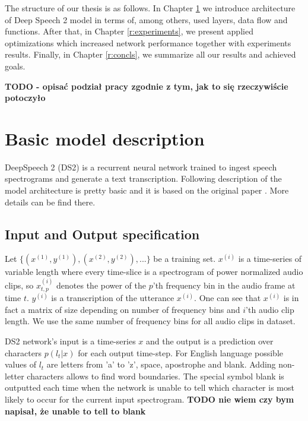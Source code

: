 \documentclass[licencjacka,en]{pracamgr}
\begin{document}
The structure of our thesis is as follows. In Chapter \ref{r:desc} we introduce architecture of Deep Speech 2 model in terms of, among others, used layers, data flow and functions. After that, in Chapter \ref{r:experiments}, we present applied optimizations which increased network performance together with experiments results. Finally, in Chapter \ref{r:concls}, we summarize all our results and achieved goals.

\textbf{TODO - opisać podział pracy zgodnie z tym, jak to się rzeczywiście potoczyło}

\chapter{Basic model description}\label{r:desc}

DeepSpeech 2 (DS2) is a recurrent neural network trained to ingest speech spectrograms and generate a text transcription.
Following description of the model architecture is pretty basic and it is based on the original paper \cite{DS2}. More details can be find there.

\section{Input and Output specification} \label{sec:input}
Let $\{(x^{(1)}, y^{(1)}), (x^{(2)}, y^{(2)}), ...\}$ be a training set. $x^{(i)}$ is a time-series of variable length where every time-slice is a spectrogram of power
normalized audio clips, so $x^{(i)}_{t,p}$ denotes the power of the $p$’th frequency bin in the audio frame at time $t$. $y^{(i)}$ is a transcription of the utterance $x^{(i)}$. One can see that $x^{(i)}$ is in fact a matrix of size depending on number of frequency bins and $i$'th audio clip length. We use the same number of frequency bins for all audio clips in dataset.

DS2 network's input is a time-series $x$ and the output is a prediction over characters $p(l_t|x)$ for each output time-step. For English language possible values of $l_t$ are letters from 'a' to 'z', space, apostrophe and blank. Adding non-letter characters allows to find word boundaries. The special symbol blank is outputted each time when the network is unable
to tell which character is most likely to occur for the current input spectrogram.
\textbf{TODO nie wiem czy bym napisał, że unable to tell to blank}
\end{document}
